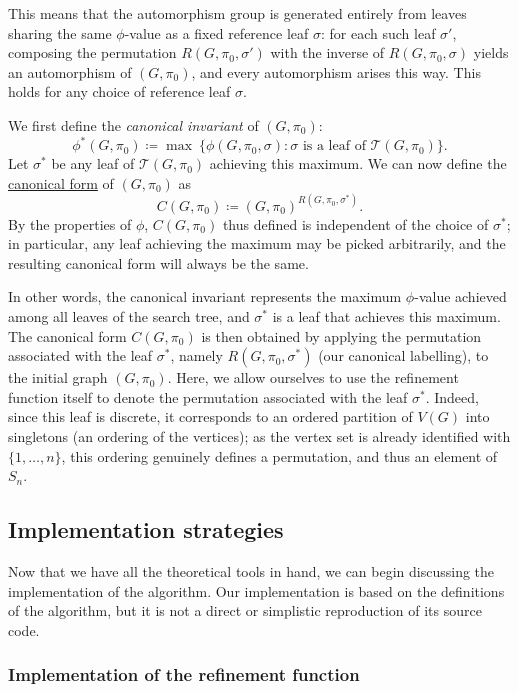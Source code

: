This means that the automorphism group is generated entirely from leaves sharing the  same $\phi$-value as a fixed reference leaf $\sigma$: for each such leaf $\sigma'$, composing  the permutation $R(G,\pi_0,\sigma')$ with the inverse of $R(G,\pi_0,\sigma)$ yields an automorphism of $(G,\pi_0)$, and every automorphism arises this way. This holds for any choice of reference leaf $\sigma$.


We first define the \emph{canonical invariant} of $(G,\pi_0)$:
\[
\phi^*(G,\pi_0) \coloneqq \max\ \{\phi(G,\pi_0, \sigma): \sigma \text{ is a leaf of } \mathcal{T}(G,\pi_0)\}.
\]
Let $\sigma^*$ be any leaf of $\mathcal{T}(G, \pi_0)$ achieving this maximum. We can now define 
the \hyperref[def:canonical form]{canonical form} of $(G,\pi_0)$ as
\[
C(G, \pi_0) \coloneqq {(G, \pi_0)}^{R(G, \pi_0, \sigma^*)}.
\]
By the properties of $\phi$, $C(G, \pi_0)$ thus defined is independent of the choice of 
$\sigma^*$; in particular, any leaf achieving the maximum may be picked arbitrarily, and 
the resulting canonical form will always be the same.

In other words, the canonical invariant represents the maximum $\phi$-value achieved among 
all leaves of the search tree, and $\sigma^*$ is a leaf that achieves this maximum. The 
canonical form $C(G, \pi_0)$ is then obtained by applying the permutation associated with 
the leaf $\sigma^*$, namely $R(G, \pi_0, \sigma^*)$ (our canonical labelling), to the initial 
graph $(G, \pi_0)$. Here, we allow ourselves to use the refinement function itself to denote the permutation associated with the leaf $\sigma^*$. Indeed, since this leaf is discrete, it corresponds to an ordered partition of $V(G)$ into singletons (an ordering of the vertices); as the vertex set is already identified with $\{1,\ldots,n\}$, this ordering genuinely defines a permutation, and thus an element of $S_n$.
\subsection{Implementation strategies}

Now that we have all the theoretical tools in hand, we can begin discussing the implementation of the algorithm. Our implementation is based on the definitions of the algorithm, but it is not a direct or simplistic reproduction of its source code.

\newpage
\subsubsection{Implementation of the refinement function}


